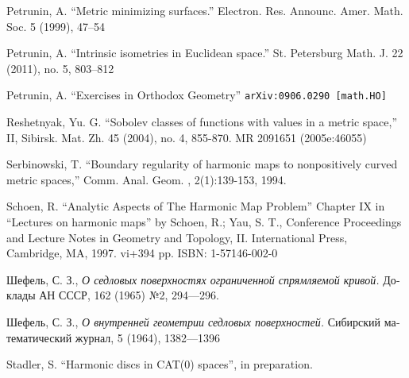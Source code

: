 \documentclass{article}
\begin{document}
\begin{thebibliography}{52}
 Petrunin, A.
``Metric minimizing surfaces.''
Electron. Res. Announc. Amer. Math. Soc. 5 (1999), 47--54 

 Petrunin, A.
``Intrinsic isometries in Euclidean space.''
St. Petersburg Math. J. 22 (2011), no. 5, 803--812 

 Petrunin, A. 
``Exercises in Orthodox Geometry''
{\tt arXiv:0906.0290 [math.HO]}

Reshetnyak, Yu. G. ``Sobolev classes of functions with values in a metric space,'' II, Sibirsk. Mat. Zh. 45 (2004), no. 4, 855-870. MR 2091651 (2005e:46055)

 Serbinowski,  T. ``Boundary regularity of harmonic maps to nonpositively curved metric spaces,''
Comm. Anal. Geom. , 2(1):139-153, 1994.

Schoen, R. ``Analytic Aspects of The Harmonic Map Problem'' Chapter IX in  
``Lectures on harmonic maps'' by Schoen, R.; Yau, S. T.,  
Conference Proceedings and Lecture Notes in Geometry and Topology, II. International Press, Cambridge, MA, 1997. vi+394 pp. ISBN: 1-57146-002-0

\begin{otherlanguage}{russian}
Шефель, С. З.,
\textit{О седловых поверхностях ограниченной спрямляемой кривой.}
Доклады АН СССР, 162 (1965) №2, 
294---296.
\end{otherlanguage}

\begin{otherlanguage}{russian}
Шефель, С. З., 
\textit{О внутренней геометрии седловых поверхностей.}
Сибирский математический журнал, 5 (1964), 1382---1396
\end{otherlanguage}

 Stadler, S. ``Harmonic discs in CAT(0) spaces'', in preparation.



\end{thebibliography}
\end{document}
